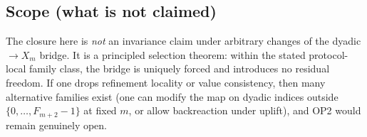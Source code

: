 \subsection{Scope (what is not claimed)}
\label{subsec:fold_family_uniqueness_scope}

The closure here is \emph{not} an invariance claim under arbitrary changes of the dyadic$\to X_m$ bridge.
It is a principled selection theorem: within the stated protocol-local family class, the bridge is uniquely forced and introduces no residual freedom.
If one drops refinement locality or value consistency, then many alternative families exist (one can modify the map on dyadic indices outside $\{0,\dots,F_{m+2}-1\}$ at fixed $m$, or allow backreaction under uplift), and OP2 would remain genuinely open.


